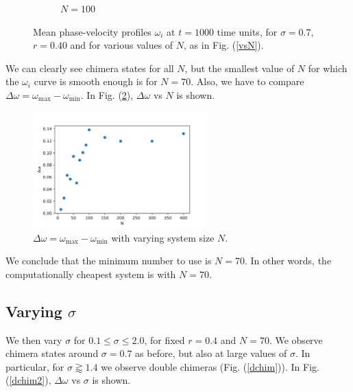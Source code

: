 \documentclass[a4paper,12pt]{article}
\begin{document}
\begin{figure}[H]
\begin{subfigure}{.32\textwidth}
  \caption{$N=100$}
\end{subfigure}
\caption{Mean phase-velocity profiles $\omega_i$ at $t=1000$ time units, for $\sigma = 0.7$, $r=0.40$ and for various values of $N$, as in Fig. (\ref{vsN}).}
\label{vsN2}
\end{figure}
\noindent We can clearly see chimera states for all $N$, but the smallest value of $N$ for which the $\omega_i$ curve is smooth enough is for $N=70$. Also, we have to compare $\Delta \omega = \omega_{\text{max}}-\omega_{\text{min}}$. In Fig. (\ref{dw}), $\Delta \omega$ vs $N$ is shown.

\begin{figure}[H]
\centering
\includegraphics[width=0.6\textwidth]{deltaw_scatter.png}
\caption{$\Delta \omega = \omega_{\text{max}}-\omega_{\text{min}}$ with varying system size $N$.}
\label{dw}
\end{figure}
\noindent We conclude that the minimum number to use is $N=70$. In other words, the computationally cheapest system is with $N=70$.

\subsection{Varying $\sigma$}
We then vary $\sigma$ for $0.1 \leq \sigma \leq 2.0$, for fixed $r=0.4$ and $N=70$. We observe chimera states around $\sigma=0.7$ as before, but also at large values of $\sigma$. In particular, for $\sigma \gtrapprox 1.4$ we observe double chimeras (Fig. (\ref{dchim})). In Fig. (\ref{dchim2}), $\Delta \omega$ vs $\sigma$ is shown.
\end{document}
